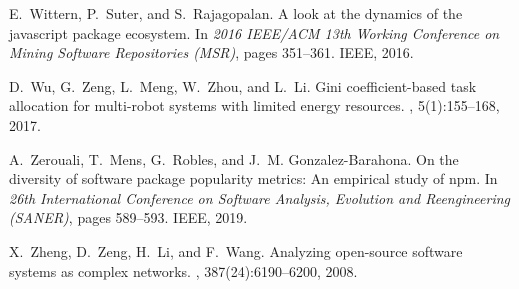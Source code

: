 \documentclass[10pt,conference]{IEEEtran}
\begin{document}
\begin{thebibliography}{10}
E.~Wittern, P.~Suter, and S.~Rajagopalan.
\newblock A look at the dynamics of the javascript package ecosystem.
\newblock In {\em 2016 IEEE/ACM 13th Working Conference on Mining Software
  Repositories (MSR)}, pages 351--361. IEEE, 2016.

D.~Wu, G.~Zeng, L.~Meng, W.~Zhou, and L.~Li.
\newblock Gini coefficient-based task allocation for multi-robot systems with
  limited energy resources.
, 5(1):155--168, 2017.

A.~Zerouali, T.~Mens, G.~Robles, and J.~M. Gonzalez-Barahona.
\newblock On the diversity of software package popularity metrics: An empirical
  study of npm.
\newblock In {\em 26th International Conference on Software Analysis, Evolution
  and Reengineering (SANER)}, pages 589--593. IEEE, 2019.

X.~Zheng, D.~Zeng, H.~Li, and F.~Wang.
\newblock Analyzing open-source software systems as complex networks.
, 387(24):6190--6200, 2008.

\end{thebibliography}
\end{document}
